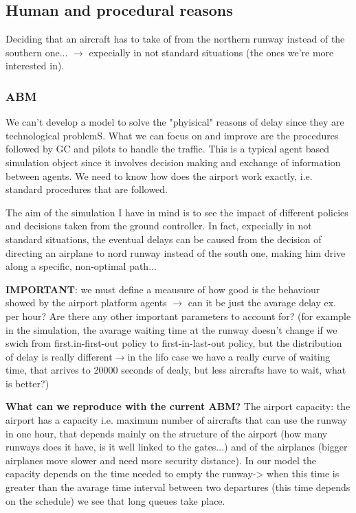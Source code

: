 \documentclass{article}
\begin{document}
\subsection*{Human and procedural reasons}
Deciding that an aircraft has to take of from the northern runway instead of the southern one... $ \rightarrow $ expecially in not standard situations (the ones we're more interested in).
\subsubsection*{ABM}
We can't develop a model to solve the "phyisical" reasons of delay since they are technological problemS. What we can focus on and improve are the procedures followed by GC and pilots to handle the traffic. This is a typical agent based simulation object since it involves decision making and exchange of information between agents. We need to know how does the airport work exactly, i.e. standard procedures that are followed. 

The aim of the simulation I have in mind is to see the impact of different policies and decisions taken from the ground controller. In fact, expecially in not standard situations, the eventual delays can be caused from the decision of directing an airplane to nord runway instead of the south one, making him drive along a specific, non-optimal path...


\textbf{IMPORTANT}: we must define a meausure of how good is the behaviour showed by the airport platform agents $ \rightarrow $ can it be just the avarage delay ex. per hour? Are there any other important parameters to account for? (for example in the simulation, the avarage waiting time at the runway doesn't change if we swich from first.in-first-out policy to first-in-last-out policy, but the distribution of delay is really different$ \rightarrow $in the lifo case we have a really curve of waiting time, that arrives to 20000 seconds of dealy, but less aircrafts have to wait, what is better?)

\textbf{What can we reproduce with the current ABM?}  The airport capacity: the airport has a capacity i.e. maximum number of aircrafts that can use the runway in one hour, that depends mainly on the structure of the airport (how many runways does it have, is it well linked to the gates...) and of the airplanes (bigger airplanes move slower and need more security distance). In our model the capacity depends on the time needed to empty the runway-> when this time is greater than the avarage time interval between two departures (this time depends on the schedule) we see that long queues take place.
\end{document}
